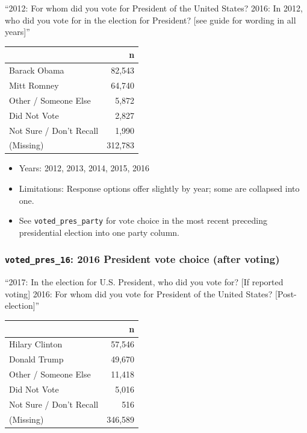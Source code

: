\documentclass[10pt,article,oneside]{memoir}
\theoremstyle{definition}
\begin{document}
``2012: For whom did you vote for President of the United States? 2016:
In 2012, who did you vote for in the election for President? {[}see
guide for wording in all years{]}''

\begin{table}[H]
\centering
\begin{tabular}{lr}
\toprule
 & n\\
\midrule
Barack Obama & 82,543\\
Mitt Romney & 64,740\\
Other / Someone Else & 5,872\\
Did Not Vote & 2,827\\
Not Sure / Don't Recall & 1,990\\
(Missing) & 312,783\\
\bottomrule
\end{tabular}
\end{table}

\begin{itemize}
\tightlist
\item
  Years: 2012, 2013, 2014, 2015, 2016
\item
  Limitations: Response options offer slightly by year; some are
  collapsed into one.
\item
  See \texttt{voted\_pres\_party} for vote choice in the most recent
  preceding presidential election into one party column.
\end{itemize}

\hypertarget{voted_pres_16-2016-president-vote-choice-after-voting}{%
\subsubsection{\texorpdfstring{\texttt{voted\_pres\_16}: 2016 President
vote choice (after
voting)}{voted\_pres\_16: 2016 President vote choice (after voting)}}\label{voted_pres_16-2016-president-vote-choice-after-voting}}

``2017: In the election for U.S. President, who did you vote for? {[}If
reported voting{]} 2016: For whom did you vote for President of the
United States? {[}Post-election{]}''

\begin{table}[H]
\centering
\begin{tabular}{lr}
\toprule
 & n\\
\midrule
Hilary Clinton & 57,546\\
Donald Trump & 49,670\\
Other / Someone Else & 11,418\\
Did Not Vote & 5,016\\
Not Sure / Don't Recall & 516\\
(Missing) & 346,589\\
\bottomrule
\end{tabular}
\end{table}
\end{document}
